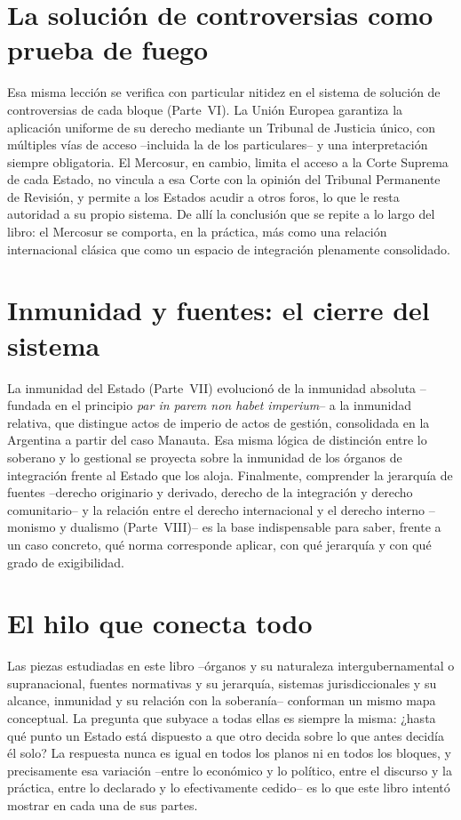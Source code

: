 \documentclass[12pt,oneside]{book}
\begin{document}
\section{La solución de controversias como prueba de fuego}

Esa misma lección se verifica con particular nitidez en el sistema de solución de controversias de cada bloque (Parte~VI). La Unión Europea garantiza la aplicación uniforme de su derecho mediante un Tribunal de Justicia único, con múltiples vías de acceso --incluida la de los particulares-- y una interpretación siempre obligatoria. El Mercosur, en cambio, limita el acceso a la Corte Suprema de cada Estado, no vincula a esa Corte con la opinión del Tribunal Permanente de Revisión, y permite a los Estados acudir a otros foros, lo que le resta autoridad a su propio sistema. De allí la conclusión que se repite a lo largo del libro: el Mercosur se comporta, en la práctica, más como una relación internacional clásica que como un espacio de integración plenamente consolidado.

\section{Inmunidad y fuentes: el cierre del sistema}

La inmunidad del Estado (Parte~VII) evolucionó de la inmunidad absoluta --fundada en el principio \emph{par in parem non habet imperium}-- a la inmunidad relativa, que distingue actos de imperio de actos de gestión, consolidada en la Argentina a partir del caso Manauta. Esa misma lógica de distinción entre lo soberano y lo gestional se proyecta sobre la inmunidad de los órganos de integración frente al Estado que los aloja. Finalmente, comprender la jerarquía de fuentes --derecho originario y derivado, derecho de la integración y derecho comunitario-- y la relación entre el derecho internacional y el derecho interno --monismo y dualismo (Parte~VIII)-- es la base indispensable para saber, frente a un caso concreto, qué norma corresponde aplicar, con qué jerarquía y con qué grado de exigibilidad.

\section{El hilo que conecta todo}

Las piezas estudiadas en este libro --órganos y su naturaleza intergubernamental o supranacional, fuentes normativas y su jerarquía, sistemas jurisdiccionales y su alcance, inmunidad y su relación con la soberanía-- conforman un mismo mapa conceptual. La pregunta que subyace a todas ellas es siempre la misma: ¿hasta qué punto un Estado está dispuesto a que otro decida sobre lo que antes decidía él solo? La respuesta nunca es igual en todos los planos ni en todos los bloques, y precisamente esa variación --entre lo económico y lo político, entre el discurso y la práctica, entre lo declarado y lo efectivamente cedido-- es lo que este libro intentó mostrar en cada una de sus partes.
\end{document}
